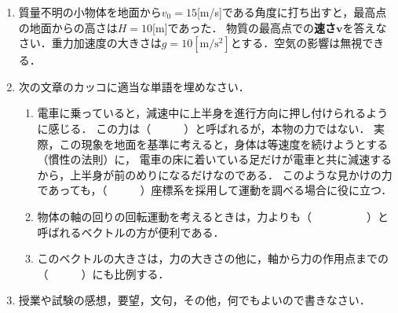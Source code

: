 \documentclass[a4paper,11pt]{ltjsarticle}
\begin{document}
\begin{enumerate}
\clearpage

    \item 質量不明の小物体を地面から$v_0=15$[m/s]である角度に打ち出すと，最高点の地面からの高さは$H=10$[m]であった．
    物質の最高点での\textbf{速さ}$\bm{v}$を答えなさい．重力加速度の大きさは$g=10[\mathrm{m/s^2}]$とする．空気の影響は無視できる．

\clearpage

    \item 次の文章のカッコに適当な単語を埋めなさい．
    
    \begin{enumerate}[label=(\arabic*)]
        \item 電車に乗っていると，減速中に上半身を進行方向に押し付けられるように感じる．
        この力は（　　　）と呼ばれるが，本物の力ではない．
        実際，この現象を地面を基準に考えると，身体は等速度を続けようとする（慣性の法則）に，
        電車の床に着いている足だけが電車と共に減速するから，上半身が前のめりになるだけなのである．
        このような見かけの力であっても，（　　　）座標系を採用して運動を調べる場合に役に立つ．

        \item 物体の軸の回りの回転運動を考えるときは，力よりも（　　　　　）と呼ばれるベクトルの方が便利である．
        \item このベクトルの大きさは，力の大きさの他に，軸から力の作用点までの（　　　）にも比例する．
    \end{enumerate}

\clearpage

    \item 授業や試験の感想，要望，文句，その他，何でもよいので書きなさい．

\end{enumerate}
\end{document}
